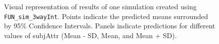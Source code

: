 \documentclass[
  letterpaper,
  DIV=11,
  numbers=noendperiod]{scrartcl}
\begin{document}
\begin{figure}


\caption{\label{fig-demoFUNSim_3wayInt}Visual representation of results
of one simulation created using \texttt{FUN\_sim\_3wayInt}. Points
indicate the predicted means surrounded by 95\% Confidence Intervals.
Panels indicate predictions for different values of subjAttr (Mean - SD,
Mean, and Mean + SD).}

\end{figure}%
\end{document}
